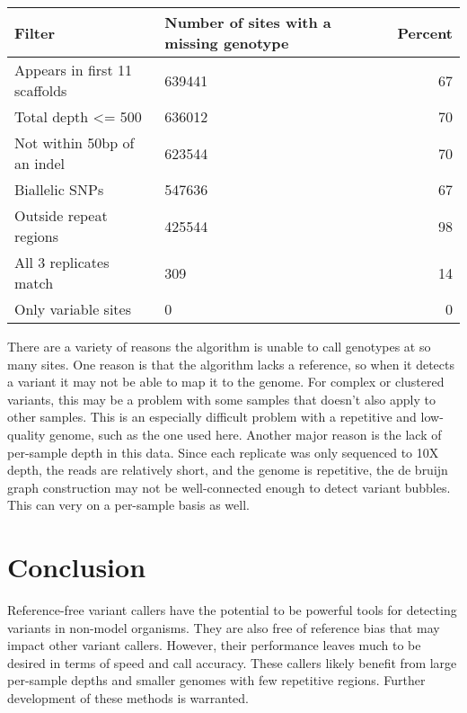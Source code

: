 \begin{table}
\centering
\begin{tabularx}{.8\textwidth}{ l X r }
\toprule
\textbf{Filter} & \textbf{Number of sites with \newline a missing genotype} & \textbf{Percent}\\
\midrule
Appears in first 11 scaffolds & 639441 & 67\\
Total depth <= 500 & 636012 & 70\\
Not within 50bp of an indel & 623544 & 70\\
Biallelic SNPs & 547636 & 67\\
Outside repeat regions & 425544 & 98\\
All 3 replicates match & 309 & 14\\
Only variable sites & 0 & 0\\
\bottomrule
\end{tabularx}
\label{tbl:ev_missing}
\end{table}


There are a variety of reasons the algorithm is unable to call genotypes at so many sites. One reason is that the algorithm lacks a reference, so when it detects a variant it may not be able to map it to the genome. For complex or clustered variants, this may be a problem with some samples that doesn't also apply to other samples. This is an especially difficult problem with a repetitive and low-quality genome, such as the one used here. Another major reason is the lack of per-sample depth in this data. Since each replicate was only sequenced to 10X depth, the reads are relatively short, and the genome is repetitive, the de bruijn graph construction may not be well-connected enough to detect variant bubbles. This can very on a per-sample basis as well.


\section{Conclusion}

Reference-free variant callers have the potential to be powerful tools for detecting variants in non-model organisms. They are also free of reference bias that may impact other variant callers. However, their performance leaves much to be desired in terms of speed and call accuracy. These callers likely benefit from large per-sample depths and smaller genomes with few repetitive regions. Further development of these methods is warranted.

\printbibliography[segment=\therefsegment]{}

